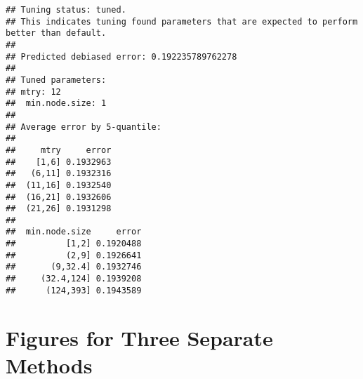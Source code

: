 \documentclass[
]{article}
\newenvironment{Shaded}{\begin{snugshade}}{\end{snugshade}}
\newcommand{\AttributeTok}[1]{\textcolor[rgb]{0.77,0.63,0.00}{#1}}
\newcommand{\CommentTok}[1]{\textcolor[rgb]{0.56,0.35,0.01}{\textit{#1}}}
\newcommand{\FunctionTok}[1]{\textcolor[rgb]{0.00,0.00,0.00}{#1}}
\newcommand{\NormalTok}[1]{#1}
\newcommand{\OtherTok}[1]{\textcolor[rgb]{0.56,0.35,0.01}{#1}}
\newcommand{\SpecialCharTok}[1]{\textcolor[rgb]{0.00,0.00,0.00}{#1}}
\begin{document}
\begin{verbatim}
## Tuning status: tuned.
## This indicates tuning found parameters that are expected to perform better than default. 
## 
## Predicted debiased error: 0.192235789762278
## 
## Tuned parameters: 
## mtry: 12
##  min.node.size: 1
## 
## Average error by 5-quantile:
## 
##     mtry     error
##    [1,6] 0.1932963
##   (6,11] 0.1932316
##  (11,16] 0.1932540
##  (16,21] 0.1932606
##  (21,26] 0.1931298
## 
##  min.node.size     error
##          [1,2] 0.1920488
##          (2,9] 0.1926641
##       (9,32.4] 0.1932746
##     (32.4,124] 0.1939208
##      (124,393] 0.1943589
\end{verbatim}

\begin{Shaded}
\end{Shaded}

\hypertarget{figures-for-three-separate-methods}{%
\section{Figures for Three Separate
Methods}\label{figures-for-three-separate-methods}}
\end{document}
